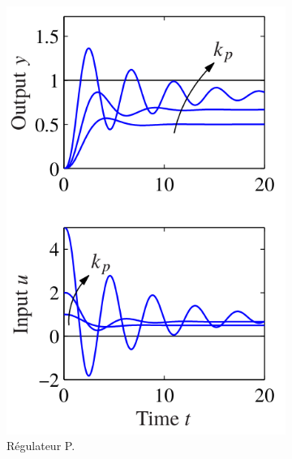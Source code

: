 \begin{figure}
  \begin{subfigure}{0.3\linewidth}
    \includegraphics[width=\linewidth]{proportionnal.png}
    \caption{Régulateur P\cite{astrom2010feedback}.}
    \label{fig:proportionnal}
  \end{subfigure}
  \begin{subfigure}{0.3\linewidth}

\end{subfigure}
\end{figure}

